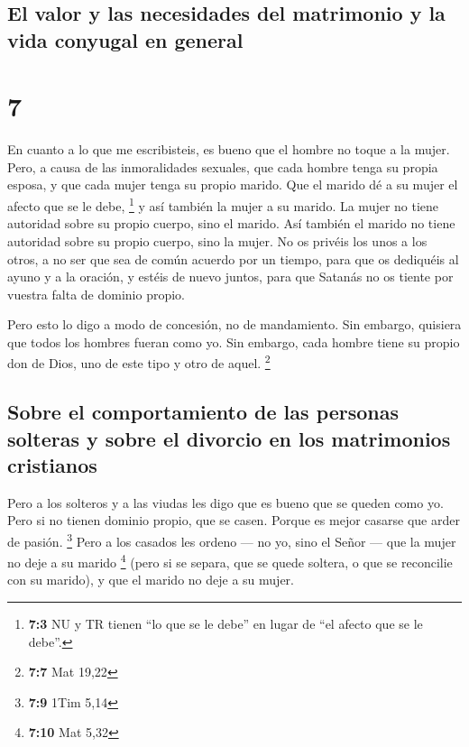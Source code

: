 \hypertarget{el-valor-y-las-necesidades-del-matrimonio-y-la-vida-conyugal-en-general}{%
\subsection{El valor y las necesidades del matrimonio y la vida conyugal
en
general}\label{el-valor-y-las-necesidades-del-matrimonio-y-la-vida-conyugal-en-general}}

\hypertarget{section-6}{%
\section{7}\label{section-6}}

 En cuanto a lo que me escribisteis, es bueno que el
hombre no toque a la mujer.  Pero, a causa de las
inmoralidades sexuales, que cada hombre tenga su propia esposa, y que
cada mujer tenga su propio marido.  Que el marido dé a su
mujer el afecto que se le debe, \footnote{\textbf{7:3} NU y TR tienen
  ``lo que se le debe'' en lugar de ``el afecto que se le debe''.} y así
también la mujer a su marido.  La mujer no tiene autoridad
sobre su propio cuerpo, sino el marido. Así también el marido no tiene
autoridad sobre su propio cuerpo, sino la mujer.  No os
privéis los unos a los otros, a no ser que sea de común acuerdo por un
tiempo, para que os dediquéis al ayuno y a la oración, y estéis de nuevo
juntos, para que Satanás no os tiente por vuestra falta de dominio
propio.

 Pero esto lo digo a modo de concesión, no de mandamiento.
 Sin embargo, quisiera que todos los hombres fueran como
yo. Sin embargo, cada hombre tiene su propio don de Dios, uno de este
tipo y otro de aquel. \footnote{\textbf{7:7} Mat 19,22}

\hypertarget{sobre-el-comportamiento-de-las-personas-solteras-y-sobre-el-divorcio-en-los-matrimonios-cristianos}{%
\subsection{Sobre el comportamiento de las personas solteras y sobre el
divorcio en los matrimonios
cristianos}\label{sobre-el-comportamiento-de-las-personas-solteras-y-sobre-el-divorcio-en-los-matrimonios-cristianos}}

 Pero a los solteros y a las viudas les digo que es bueno
que se queden como yo.  Pero si no tienen dominio propio,
que se casen. Porque es mejor casarse que arder de pasión. \footnote{\textbf{7:9}
  1Tim 5,14}  Pero a los casados les ordeno --- no yo,
sino el Señor --- que la mujer no deje a su marido \footnote{\textbf{7:10}
  Mat 5,32}  (pero si se separa, que se quede soltera, o
que se reconcilie con su marido), y que el marido no deje a su mujer.


